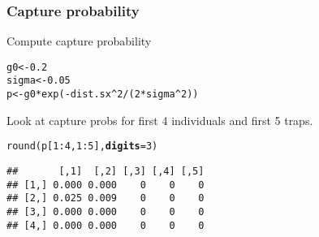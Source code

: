 \documentclass[color=usenames,dvipsnames]{beamer}\usepackage[]{graphicx}\usepackage[]{color}
\makeatletter
\newcommand{\hlnum}[1]{\textcolor[rgb]{0.69,0.494,0}{#1}}%
\newcommand{\hlopt}[1]{\textcolor[rgb]{0,0,0}{#1}}%
\newcommand{\hlstd}[1]{\textcolor[rgb]{0,0,0}{#1}}%
\newcommand{\hlkwb}[1]{\textcolor[rgb]{0,0.341,0.682}{#1}}%
\newcommand{\hlkwc}[1]{\textcolor[rgb]{0,0,0}{\textbf{#1}}}%
\newcommand{\hlkwd}[1]{\textcolor[rgb]{0.004,0.004,0.506}{#1}}%
\newenvironment{kframe}{%
 \def\at@end@of@kframe{}%
 \ifinner\ifhmode%
  \def\at@end@of@kframe{\end{minipage}}%
  \begin{minipage}{\columnwidth}%
 \fi\fi%
 \def\FrameCommand##1{\hskip\@totalleftmargin \hskip-\fboxsep
 \colorbox{shadecolor}{##1}\hskip-\fboxsep
     \hskip-\linewidth \hskip-\@totalleftmargin \hskip\columnwidth}%
 \MakeFramed {\advance\hsize-\width
   \@totalleftmargin\z@ \linewidth\hsize
   \@setminipage}}%
 {\par\unskip\endMakeFramed%
 \at@end@of@kframe}
\newenvironment{knitrout}{}{} %
\makeatother
\begin{document}
\begin{frame}[fragile]
  \frametitle{Capture probability}
  Compute capture probability
\begin{knitrout}\footnotesize
{}\color{fgcolor}\begin{kframe}
\begin{alltt}
\hlstd{g0} \hlkwb{<-} \hlnum{0.2}
\hlstd{sigma} \hlkwb{<-} \hlnum{0.05}
\hlstd{p} \hlkwb{<-} \hlstd{g0}\hlopt{*}\hlkwd{exp}\hlstd{(}\hlopt{-}\hlstd{dist.sx}\hlopt{^}\hlnum{2}\hlopt{/}\hlstd{(}\hlnum{2}\hlopt{*}\hlstd{sigma}\hlopt{^}\hlnum{2}\hlstd{))}
\end{alltt}
\end{kframe}
\end{knitrout}
\pause
\vfill
  Look at capture probs for first 4 individuals and first 5 traps.
\begin{knitrout}\footnotesize
{}\color{fgcolor}\begin{kframe}
\begin{alltt}
\hlkwd{round}\hlstd{(p[}\hlnum{1}\hlopt{:}\hlnum{4}\hlstd{,}\hlnum{1}\hlopt{:}\hlnum{5}\hlstd{],} \hlkwc{digits}\hlstd{=}\hlnum{3}\hlstd{)}
\end{alltt}
\begin{verbatim}
##       [,1]  [,2] [,3] [,4] [,5]
## [1,] 0.000 0.000    0    0    0
## [2,] 0.025 0.009    0    0    0
## [3,] 0.000 0.000    0    0    0
## [4,] 0.000 0.000    0    0    0
\end{verbatim}
\end{kframe}
\end{knitrout}

\end{frame}
\end{document}
